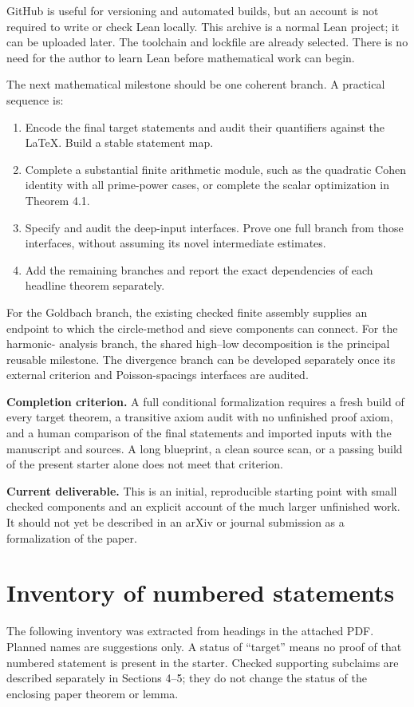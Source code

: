 \documentclass[11pt]{article}
\newcommand{\page}{\newpage}
\begin{document}
GitHub is useful for versioning and automated builds, but an account is not
required to write or check Lean locally. This archive is a normal Lean project;
it can be uploaded later. The toolchain and lockfile are already selected.
There is no need for the author to learn Lean before mathematical work can begin.

The next mathematical milestone should be one coherent branch. A practical
sequence is:
\begin{enumerate}
\item Encode the final target statements and audit their quantifiers against the
LaTeX. Build a stable statement map.
\item Complete a substantial finite arithmetic module, such as the quadratic
Cohen identity with all prime-power cases, or complete the scalar optimization
in Theorem 4.1.
\item Specify and audit the deep-input interfaces. Prove one full branch from
those interfaces, without assuming its novel intermediate estimates.
\item Add the remaining branches and report the exact dependencies of each
headline theorem separately.
\end{enumerate}

For the Goldbach branch, the existing checked finite assembly supplies an endpoint
to which the circle-method and sieve components can connect. For the harmonic-
analysis branch, the shared high--low decomposition is the principal reusable
milestone. The divergence branch can be developed separately once its external
criterion and Poisson-spacings interfaces are audited.

\textbf{Completion criterion.} A full conditional formalization requires a fresh
build of every target theorem, a transitive axiom audit with no unfinished proof
axiom, and a human comparison of the final statements and imported inputs with
the manuscript and sources. A long blueprint, a clean source scan, or a passing
build of the present starter alone does not meet that criterion.

\textbf{Current deliverable.} This is an initial, reproducible starting point with
small checked components and an explicit account of the much larger unfinished
work. It should not yet be described in an arXiv or journal submission as a
formalization of the paper.

\page
\appendix
\section{Inventory of numbered statements}
The following inventory was extracted from headings in the attached PDF. Planned
names are suggestions only. A status of ``target'' means no proof of that numbered
statement is present in the starter. Checked supporting subclaims are described
separately in Sections 4--5; they do not change the status of the enclosing paper
theorem or lemma.
\small

\normalsize
\end{document}
